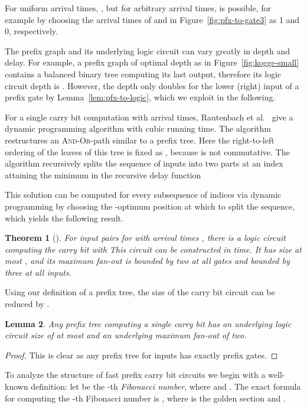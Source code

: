 \documentclass[11pt,final,microtype]{scrartcl}
\theoremstyle{plain}
\newtheorem{theorem}{Theorem}[section]
\newtheorem{lemma}[theorem]{Lemma}
\theoremstyle{definition}
\theoremstyle{remark}
\begin{document}
For uniform arrival times, , but for arbitrary arrival times,
 is possible, for example by choosing the arrival times of
 and  in Figure~\ref{fig:pfx-to-gate3} as 1 and 0, respectively. 

The prefix graph and its underlying logic circuit can
vary greatly in depth and delay. For example, a prefix graph of
optimal depth  as in Figure~\ref{fig:kogge-small}
contains a balanced binary tree computing its last output, therefore
its logic circuit depth is . However, the depth only
doubles for the lower (right) input of a prefix gate by
Lemma~\ref{lem:pfx-to-logic}, which we exploit in the following.

For a single carry bit computation with arrival times, Rautenbach et
al.\ \cite{bonn1} give a dynamic programming algorithm with cubic
running time.  The algorithm restructures an \textsc{And-Or}-path
similar to a prefix tree. Here the right-to-left ordering of the
leaves of this tree is fixed as , because  is
not commutative. The algorithm recursively splits the sequence of
inputs into two parts at an index  attaining the minimum in the
recursive delay function

This solution can be computed for every subsequence  of indices
via dynamic programming by choosing the -optimum position
 at which to split the sequence, which yields the following
result. 
\begin{theorem}[{\cite{bonn1}}] \label{thm:bl-main} For  input pairs  for 
  with arrival times , there is a logic circuit computing the carry bit  with
 This circuit can be
  constructed in  time. It has size at most , and its maximum fan-out is bounded by two at all gates and
  bounded by three at all inputs.
\end{theorem}
Using our definition of a prefix tree, the size of the carry bit circuit can be reduced by .
\begin{lemma} \label{lem:small-bl} Any prefix tree computing a single
  carry bit has an underlying  logic circuit  size of at most  and an underlying 
  maximum fan-out of two.
\end{lemma} 
\begin{proof}
  This is clear as any   prefix tree for  inputs  has exactly  prefix gates. 
\end{proof}
To analyze the structure of fast prefix carry bit circuits we
begin with a well-known definition: let  be the -th
\emph{Fibonacci number}, where  and . The exact formula for computing the -th Fibonacci number
is , where  is the golden section and .
\end{document}
